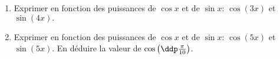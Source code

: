 
\begin{exercice}  \;
\begin{enumerate}
\item Exprimer en fonction des puissances de $\cos{x}$ et de $\sin{x}$: $\cos{(3x)}$ et $\sin{(4x)}.$
\item Exprimer en fonction des puissances de $\cos{x}$ et de $\sin{x}$: $\cos{(5x)}$ et $\sin{(5x)}.$ En d\'eduire la valeur de $\cos{\left(  \ddp\frac{\pi}{10}\right)}$.
\end{enumerate}
\end{exercice}
